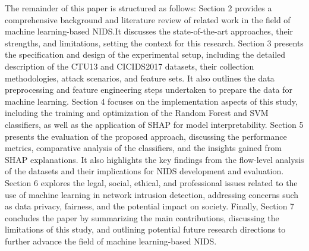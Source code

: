 The remainder of this paper is structured as follows: Section 2 provides a comprehensive background and literature review of related work in the field of machine learning-based NIDS.\@ It discusses the state-of-the-art approaches, their strengths, and limitations, setting the context for this research. Section 3 presents the specification and design of the experimental setup, including the detailed description of the CTU13 and CICIDS2017 datasets, their collection methodologies, attack scenarios, and feature sets. It also outlines the data preprocessing and feature engineering steps undertaken to prepare the data for machine learning. Section 4 focuses on the implementation aspects of this study, including the training and optimization of the Random Forest and SVM classifiers, as well as the application of SHAP for model interpretability. Section 5 presents the evaluation of the proposed approach, discussing the performance metrics, comparative analysis of the classifiers, and the insights gained from SHAP explanations. It also highlights the key findings from the flow-level analysis of the datasets and their implications for NIDS development and evaluation. Section 6 explores the legal, social, ethical, and professional issues related to the use of machine learning in network intrusion detection, addressing concerns such as data privacy, fairness, and the potential impact on society. Finally, Section 7 concludes the paper by summarizing the main contributions, discussing the limitations of this study, and outlining potential future research directions to further advance the field of machine learning-based NIDS.\@